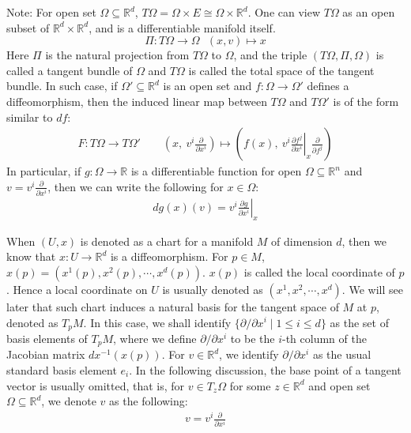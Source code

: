 \documentclass[11pt]{book}
\theoremstyle{break}
\theoremstyle{break}
\newcommand{\R}{\mathbb{R}}
\newcommand{\pd}{\partial}
\newcommand{\note}{\color{red}Note: \color{black}}
\begin{document}
\note For open set $\Omega \subseteq \R^d$, $T\Omega = \Omega \times E\cong \Omega \times \R^d$. One can view $T\Omega$ as an open subset of $\R^d \times \R^d$, and is a differentiable manifold itself.  
$$\Pi: T\Omega \to \Omega \ \ \ (x,v)\mapsto x$$ 
Here $\Pi$ is the natural projection from $T\Omega$ to $\Omega$, and the triple $(T\Omega,\Pi, \Omega)$ is called a tangent bundle of $\Omega$ and $T\Omega$ is called the total space of the tangent bundle. In such case, if $\Omega'\subseteq \R^d$ is an open set and $f:\Omega\to \Omega'$ defines a diffeomorphism, then the induced linear map between $T\Omega$ and $T\Omega'$ is of the form similar to $df$:
\begin{align*}
F: T\Omega \to T\Omega' \qquad \left(x,\ v^i\frac{\pd}{\pd x^i}\right)\mapsto \left( f(x),\  v^i \left.\frac{\pd f^j}{\pd x^i}\right|_{x}\frac{\pd}{\pd f^j}\right)
\end{align*}
In particular, if $g:\Omega \to \R$ is a differentiable function for open $\Omega \subseteq \R^n$ and $v = v^i \frac{\pd}{\pd x^i}$, then we can write the following for $x \in \Omega$:
\begin{align*}
dg(x)(v) =v^i \left.\frac{\pd g}{\pd x^i}\right|_x
\end{align*}

When $(U,x)$ is denoted as a chart for a manifold $M$ of dimension $d$, then we know that $x:U \to \R^d$ is a diffeomorphism. For $p \in M$, $x(p) = (x^1(p),x^2(p),\cdots, x^d(p))$. $x(p)$ is called the local coordinate of $p$. Hence a local coordinate on $U$ is usually denoted as $(x^1,x^2,\cdots, x^d)$. We will see later that such chart induces a natural basis for the tangent space of $M$ at $p$, denoted as $T_pM$. In this case, we shall identify $\{\pd/\pd x^i\mid 1\leq i \leq d\}$ as the set of basis elements of $T_pM$, where we define $\pd/\pd x^i$ to be the $i$-th column of the Jacobian matrix $dx^{-1}(x(p))$. For $v\in \R^d$, we identify $\pd/\pd x^i$ as the usual standard basis element $e_i$. In the following discussion, the base point of a tangent vector is usually omitted, that is, for $v \in T_z\Omega$ for some $z \in \R^d$ and open set $\Omega \subseteq \R^d$, we denote $v$ as the following:
\begin{align*}
v = v^i \frac{\pd}{\pd x^i}
\end{align*}
\end{document}
